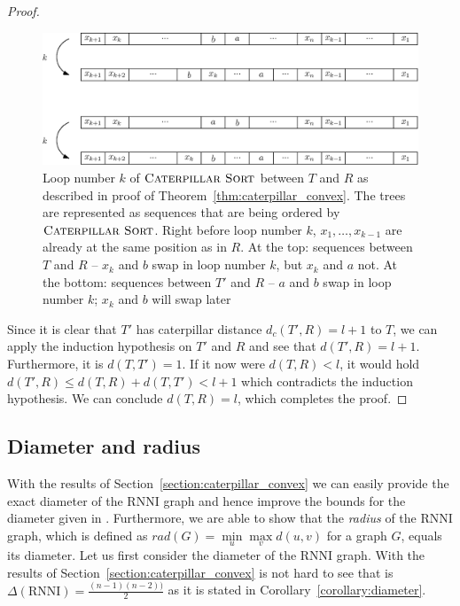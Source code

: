 \documentclass{amsart}
\newcommand{\rnni}{\mathrm{RNNI}}
\newcommand{\csort}{\textsc{Caterpillar Sort}}
\begin{document}
\begin{proof}
    \begin{figure}[H]
    	\centering
    	\includegraphics[width=\textwidth]{cat_convex_seq_example}
    	\caption{Loop number $k$ of $\csort$ between $T$ and $R$ as described in proof of Theorem~\ref{thm:caterpillar_convex}.
        The trees are represented as sequences that are being ordered by $\csort$.
        Right before loop number $k$, $x_1, \ldots, x_{k-1}$ are already at the same position as in $R$.
        At the top: sequences between $T$ and $R$ -- $x_k$ and $b$ swap in loop number $k$, but $x_k$ and $a$ not.
        At the bottom: sequences between $T'$ and $R$ -- $a$ and $b$ swap in loop number $k$; $x_k$ and $b$ will swap later}
    	\label{fig:cat_convex_seq_example}
    \end{figure}

    Since it is clear that $T'$ has caterpillar distance $d_c(T',R) = l+1$ to $T$, we can apply the induction hypothesis on $T'$ and $R$ and see that $d(T',R) = l+1$.
    Furthermore, it is $d(T,T') = 1$.
    If it now were $d(T,R) < l$, it would hold $d(T',R) \leq d(T,R) + d(T,T') < l + 1$ which contradicts the induction hypothesis.
    We can conclude $d(T,R) = l$, which completes the proof.
\end{proof}


\subsection{Diameter and radius}
\label{section:diameter}

With the results of Section~\ref{section:caterpillar_convex} we can easily provide the exact diameter of the $\rnni$ graph and hence improve the bounds for the diameter given in \autocite{Gavryushkin2018-ol}.
Furthermore, we are able to show that the \emph{radius} of the $\rnni$ graph, which is defined as $rad(G) =  \min\limits_u \max\limits_v d(u,v)$ for a graph $G$, equals its diameter.
Let us first consider the diameter of the $\rnni$ graph.
With the results of Section~\ref{section:caterpillar_convex} is not hard to see that is $\Delta(\rnni) = \frac{(n-1)(n-2))}{2}$ as it is stated in Corollary~\ref{corollary:diameter}.
\end{document}
